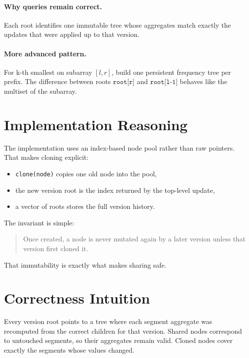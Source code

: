 \paragraph{Why queries remain correct.}
Each root identifies one immutable tree whose aggregates match exactly the updates that were applied up to that version.

\paragraph{More advanced pattern.}
For k-th smallest on subarray \([l,r]\), build one persistent frequency tree per prefix. The difference between roots
\(\texttt{root[r]}\) and \(\texttt{root[l-1]}\) behaves like the multiset of the subarray.

\section*{Implementation Reasoning}

The implementation uses an index-based node pool rather than raw pointers. That makes cloning explicit:

\begin{itemize}
  \item \texttt{clone(node)} copies one old node into the pool,
  \item the new version root is the index returned by the top-level update,
  \item a vector of roots stores the full version history.
\end{itemize}

The invariant is simple:

\begin{quote}
Once created, a node is never mutated again by a later version unless that version first cloned it.
\end{quote}

That immutability is exactly what makes sharing safe.

\section*{Correctness Intuition}

Every version root points to a tree where each segment aggregate was recomputed from the correct children for that
version. Shared nodes correspond to untouched segments, so their aggregates remain valid. Cloned nodes cover exactly the
segments whose values changed.

